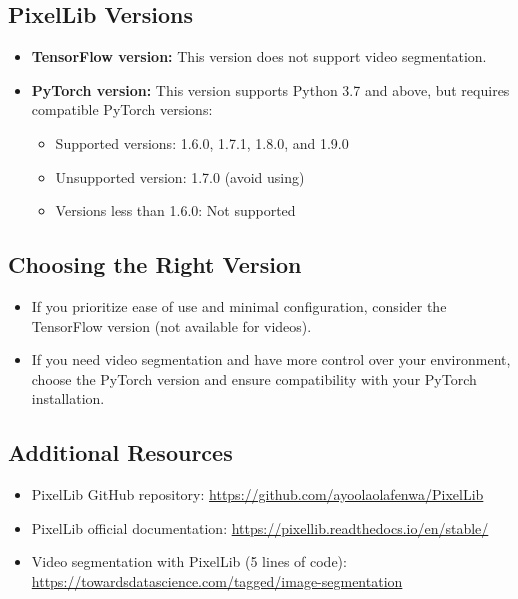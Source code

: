 \subsection*{PixelLib Versions}
\begin{itemize}[label=--]
    \item \textbf{TensorFlow version:} This version does not support video segmentation.
    \item \textbf{PyTorch version:} This version supports Python 3.7 and above, but requires compatible PyTorch versions:
    \begin{itemize}[label=$\bullet$]
        \item Supported versions: 1.6.0, 1.7.1, 1.8.0, and 1.9.0
        \item Unsupported version: 1.7.0 (avoid using)
        \item Versions less than 1.6.0: Not supported
    \end{itemize}
\end{itemize}

\subsection*{Choosing the Right Version}
\begin{itemize}[label=--]
    \item If you prioritize ease of use and minimal configuration, consider the TensorFlow version (not available for videos).
    \item If you need video segmentation and have more control over your environment, choose the PyTorch version and ensure compatibility with your PyTorch installation.
\end{itemize}

\subsection*{Additional Resources}
\begin{itemize}[label=--]
    \item PixelLib GitHub repository: \url{https://github.com/ayoolaolafenwa/PixelLib}
    \item PixelLib official documentation: \url{https://pixellib.readthedocs.io/en/stable/}
    \item Video segmentation with PixelLib (5 lines of code): \url{https://towardsdatascience.com/tagged/image-segmentation}
\end{itemize}

